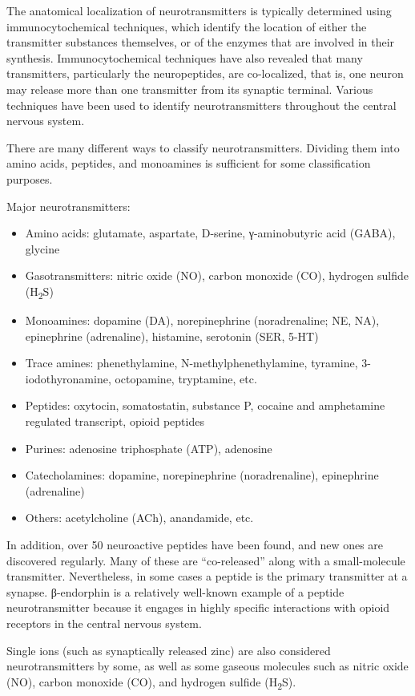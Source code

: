 The anatomical localization of neurotransmitters is typically determined using immunocytochemical techniques, which identify the location of either the transmitter substances themselves, or of the enzymes that are involved in their synthesis. Immunocytochemical techniques have also revealed that many transmitters, particularly the neuropeptides, are co-localized, that is, one neuron may release more than one transmitter from its synaptic terminal. Various techniques have been used to identify neurotransmitters throughout the central nervous system.

There are many different ways to classify neurotransmitters. Dividing them into amino acids, peptides, and monoamines is sufficient for some classification purposes.

Major neurotransmitters:

\begin{itemize}
\tightlist
\item
  Amino acids: glutamate, aspartate, D-serine, γ-aminobutyric acid (GABA), glycine
\item
  Gasotransmitters: nitric oxide (NO), carbon monoxide (CO), hydrogen sulfide (H\textsubscript{2}S)
\item
  Monoamines: dopamine (DA), norepinephrine (noradrenaline; NE, NA), epinephrine (adrenaline), histamine, serotonin (SER, 5-HT)
\item
  Trace amines: phenethylamine, N-methylphenethylamine, tyramine, 3-iodothyronamine, octopamine, tryptamine, etc.
\item
  Peptides: oxytocin, somatostatin, substance P, cocaine and amphetamine regulated transcript, opioid peptides
\item
  Purines: adenosine triphosphate (ATP), adenosine
\item
  Catecholamines: dopamine, norepinephrine (noradrenaline), epinephrine (adrenaline)
\item
  Others: acetylcholine (ACh), anandamide, etc.
\end{itemize}

In addition, over 50 neuroactive peptides have been found, and new ones are discovered regularly. Many of these are ``co-released'' along with a small-molecule transmitter. Nevertheless, in some cases a peptide is the primary transmitter at a synapse. β-endorphin is a relatively well-known example of a peptide neurotransmitter because it engages in highly specific interactions with opioid receptors in the central nervous system.

Single ions (such as synaptically released zinc) are also considered neurotransmitters by some, as well as some gaseous molecules such as nitric oxide (NO), carbon monoxide (CO), and hydrogen sulfide (H\textsubscript{2}S).

